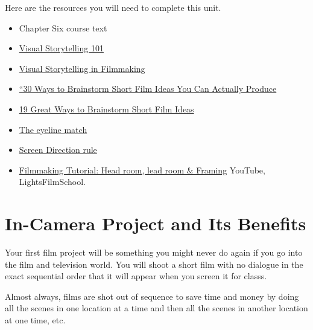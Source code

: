 \documentclass[
]{book}
\providecommand{\tightlist}{%
  \setlength{\itemsep}{0pt}\setlength{\parskip}{0pt}}
\begin{document}
Here are the resources you will need to complete this unit.

\begin{itemize}
\tightlist
\item
  Chapter Six course text\\
\item
  \href{https://www.youtube.com/watch?v=iWQQgZh9EyE}{Visual Storytelling 101}\\
\item
  \href{https://www.youtube.com/watch?v=4X5xvlTZpcY}{Visual Storytelling in Filmmaking}\\
\item
  \href{https://www.studiobinder.com/blog/short-film-ideas-you-can-actually-produce/}{``30 Ways to Brainstorm Short Film Ideas You Can Actually Produce}\\
\item
  \href{https://www.indiewire.com/2015/08/19-great-ways-to-brainstorm-short-film-ideas-58785/}{19 Great Ways to Brainstorm Short Film Ideas}\\
\item
  \href{https://www.youtube.com/watch?v=y_1H6V7uyYc}{The eyeline match}\\
\item
  \href{https://www.youtube.com/watch?v=9XOn5uxdSJc}{Screen Direction rule}
\end{itemize}

\begin{itemize}
\tightlist
\item
  \href{https://www.youtube.com/watch?v=0pd0K2u1Bk8}{Filmmaking Tutorial: Head room, lead room \& Framing} YouTube, LightsFilmSchool.
\end{itemize}

\hypertarget{in-camera-project-and-its-benefits}{%
\section{In-Camera Project and Its Benefits}\label{in-camera-project-and-its-benefits}}

Your first film project will be something you might never do again if you go into the film and television world. You will shoot a short film with no dialogue in the exact sequential order that it will appear when you screen it for classs.

Almost always, films are shot out of sequence to save time and money by doing all the scenes in one location at a time and then all the scenes in another location at one time, etc.
\end{document}

